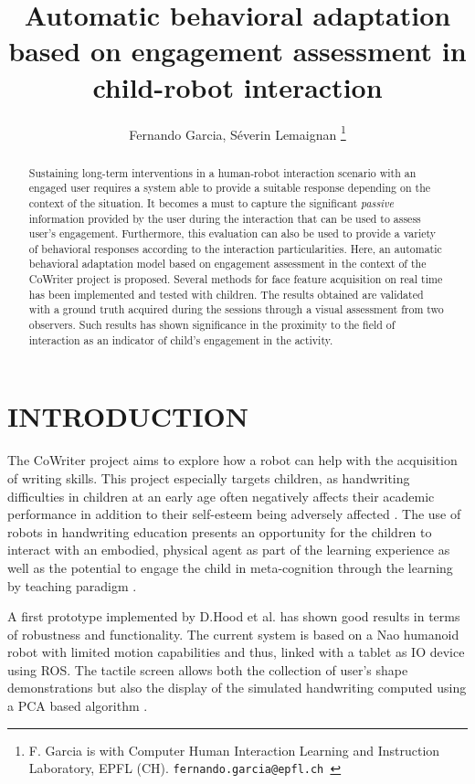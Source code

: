 \documentclass[a4paper, 10pt, conference]{ieeeconf}      %
\title{\LARGE \bf
Automatic behavioral adaptation based on engagement assessment in child-robot interaction
}
\author{Fernando Garcia, S\'everin Lemaignan%
\thanks{F. Garcia is with Computer Human Interaction Learning and Instruction Laboratory, EPFL (CH).
        {\tt\small fernando.garcia@epfl.ch }}
}
\begin{document}
\maketitle
\thispagestyle{empty}
\pagestyle{empty}


\begin{abstract}

Sustaining long-term interventions in a human-robot interaction scenario with an engaged user requires a system able to provide a suitable response depending on the context of the situation. It becomes a must to capture the significant \textit{passive} information provided by the user during the interaction that can be used to assess user's engagement. Furthermore, this evaluation can also be used to provide a variety of behavioral responses according to the interaction particularities. Here, an automatic behavioral adaptation model based on engagement assessment in the context of the CoWriter project is proposed. Several methods for face feature acquisition on real time has been implemented and tested with children. The results obtained are validated with a ground truth acquired during the sessions through a visual assessment from two observers. Such results has shown significance in the proximity to the field of interaction as an indicator of child's engagement in the activity. 

\end{abstract}


\section{INTRODUCTION}

The CoWriter project aims to explore how a robot can help with the acquisition of writing skills. This project especially targets children, as handwriting difficulties in children at an early age often negatively affects their academic performance \cite{christensen2005role} in addition to their self-esteem being adversely affected \cite{malloy1995handwriting}. The use of robots in handwriting education presents an opportunity for the children to interact with an embodied, physical agent as part of the learning experience as well as the potential to engage the child in meta-cognition through the learning by teaching paradigm \cite{palinscar1984reciprocal}.

A first prototype implemented by D.Hood et al. \cite{hood2015children} has shown good results in terms of robustness and functionality. The current system is based on a Nao humanoid robot with limited motion capabilities and thus, linked with a tablet as IO device using ROS. The tactile screen allows both the collection of user's shape demonstrations but also the display of the simulated handwriting computed using a PCA based algorithm \cite{hood2015children}.
\end{document}
